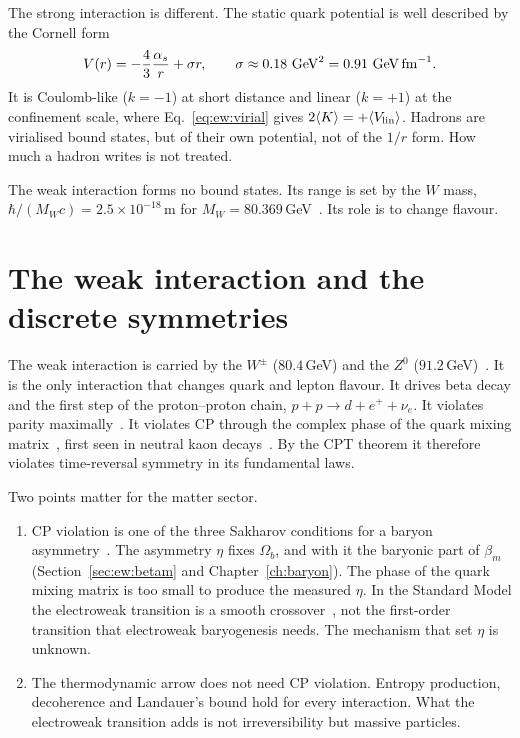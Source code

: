 The strong interaction is different. The static quark potential is well described by the Cornell form~\cite{Eichten1978}
\begin{equation}
V(r)=-\frac43\frac{\alpha_s}{r}+\sigma r,\qquad\sigma\approx0.18\ {\rm GeV}^2=0.91\ {\rm GeV\,fm}^{-1}.
\end{equation}
\calc{} It is Coulomb-like ($k=-1$) at short distance and linear ($k=+1$) at the confinement scale, where Eq.~\eqref{eq:ew:virial} gives
$2\langle K\rangle=+\langle V_{\rm lin}\rangle$. Hadrons are virialised bound states, but of their own potential, not of the $1/r$ form. How much a
hadron writes is not treated. \openprob

The weak interaction forms no bound states. Its range is set by the $W$ mass, $\hbar/(M_Wc)=2.5\times10^{-18}$\,m for $M_W=80.369$\,GeV~\cite{PDG2024}.
\calc{} Its role is to change flavour.

\section{The weak interaction and the discrete symmetries}\label{sec:ew:weak}
The weak interaction is carried by the $W^\pm$ ($80.4$\,GeV) and the $Z^0$ ($91.2$\,GeV)~\cite{PDG2022}. It is the only interaction that changes quark
and lepton flavour. It drives beta decay and the first step of the proton--proton chain, $p+p\to d+e^++\nu_e$. It violates parity
maximally~\cite{Wu1957}. It violates CP through the complex phase of the quark mixing matrix~\cite{Cabibbo1963,KobayashiMaskawa1973}, first seen in
neutral kaon decays~\cite{Christenson1964}. By the CPT theorem it therefore violates time-reversal symmetry in its fundamental laws. \observed

Two points matter for the matter sector.
\begin{enumerate}
\item CP violation is one of the three Sakharov conditions for a baryon asymmetry~\cite{Sakharov1967}. The asymmetry $\eta$ fixes $\Omega_b$, and
with it the baryonic part of $\beta_m$ (Section~\ref{sec:ew:betam} and Chapter~\ref{ch:baryon}). The phase of the quark mixing matrix is too small to produce
the measured $\eta$. In the Standard Model the electroweak transition is a smooth crossover~\cite{Kajantie1996,DOnofrio2016}, not the first-order
transition that electroweak baryogenesis needs. The mechanism that set $\eta$ is unknown. \observed
\item The thermodynamic arrow does not need CP violation. Entropy production, decoherence and Landauer's bound hold for every interaction. What the
electroweak transition adds is not irreversibility but massive particles. \interp
\end{enumerate}

